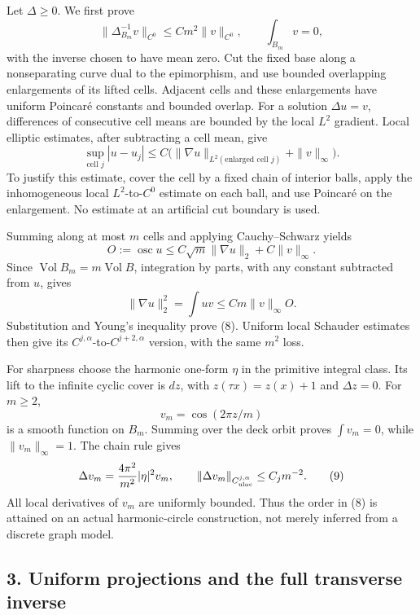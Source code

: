 \documentclass[
  11pt,
]{article}
\begin{document}
Let \(\Delta\ge0\). We first prove \[
 \|\Delta_{B_m}^{-1}v\|_{C^0}\le C m^2\|v\|_{C^0},
 \qquad \int_{B_m}v=0,
                                                               \tag{8}
\] with the inverse chosen to have mean zero. Cut the fixed base along a
nonseparating curve dual to the epimorphism, and use bounded overlapping
enlargements of its lifted cells. Adjacent cells and these enlargements
have uniform Poincaré constants and bounded overlap. For a solution
\(\Delta u=v\), differences of consecutive cell means are bounded by the
local \(L^2\) gradient. Local elliptic estimates, after subtracting a
cell mean, give \[
 \sup_{\text{cell }j}|u-u_j|
 \le C\bigl(\|\nabla u\|_{L^2(\text{enlarged cell }j)}
                  +\|v\|_\infty\bigr).
\] To justify this estimate, cover the cell by a fixed chain of interior
balls, apply the inhomogeneous local \(L^2\)-to-\(C^0\) estimate on each
ball, and use Poincaré on the enlargement. No estimate at an artificial
cut boundary is used.

Summing along at most \(m\) cells and applying Cauchy--Schwarz yields \[
 O:=\operatorname{osc}u\le C\sqrt m\|\nabla u\|_2+C\|v\|_\infty.
\] Since \(\operatorname{Vol}B_m=m\operatorname{Vol}B\), integration by
parts, with any constant subtracted from \(u\), gives \[
 \|\nabla u\|_2^2=\int uv\le C m\|v\|_\infty O.
\] Substitution and Young's inequality prove (8). Uniform local Schauder
estimates then give its \(C^{j,\alpha}\)-to-\(C^{j+2,\alpha}\) version,
with the same \(m^2\) loss.

For sharpness choose the harmonic one-form \(\eta\) in the primitive
integral class. Its lift to the infinite cyclic cover is \(dz\), with
\(z(\tau x)=z(x)+1\) and \(\Delta z=0\). For \(m\ge2\), \[
 v_m=\cos(2\pi z/m)
\] is a smooth function on \(B_m\). Summing over the deck orbit proves
\(\int v_m=0\), while \(\|v_m\|_\infty=1\). The chain rule gives \[
 \Delta v_m=\frac{4\pi^2}{m^2}|\eta|^2v_m,
 \qquad \|\Delta v_m\|_{C^{j,\alpha}_{\rm uloc}}\le C_jm^{-2}.
                                                               \tag{9}
\] All local derivatives of \(v_m\) are uniformly bounded. Thus the
order in (8) is attained on an actual harmonic-circle construction, not
merely inferred from a discrete graph model.

\hypertarget{uniform-projections-and-the-full-transverse-inverse}{%
\subsection{3. Uniform projections and the full transverse
inverse}\label{uniform-projections-and-the-full-transverse-inverse}}
\end{document}

